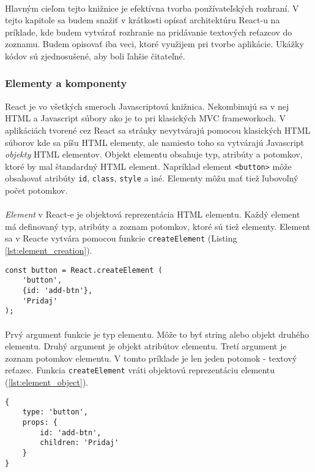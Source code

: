 \paragraph{}
Hlavným cieľom tejto knižnice je efektívna tvorba používateľských rozhraní. V tejto kapitole sa budem snažiť v krátkosti opísať architektúru React-u na príklade, kde budem vytvárať rozhranie na pridávanie textových reťazcov do zoznamu. Budem opisovať iba veci, ktoré využijem pri tvorbe aplikácie. Ukážky kódov sú zjednosušené, aby boli ľahšie čitateľné.

\subsubsection{Elementy a komponenty}
React je vo všetkých smeroch Javascriptová knižnica. Nekombinujú sa v nej HTML a Javascript súbory ako je to pri klasických MVC frameworkoch. V aplikáciách tvorené cez React sa stránky nevytvárajú pomocou klasických HTML súborov kde sa píšu HTML elementy, ale namiesto toho sa vytvárajú Javascript \emph{objekty} HTML elementov. Objekt elementu obsahuje typ, atribúty a potomkov, ktoré by mal štandardný HTML element. Napríklad element \texttt{<button>} môže obsahovať atribúty \texttt{id}, \texttt{class}, \texttt{style} a iné. Elementy môžu mať tiež ľubovoľný počet potomkov.
\paragraph{}
\emph{Element} v React-e je objektová reprezentácia HTML elementu. Každý element má definovaný typ, atribúty a zoznam potomkov, ktoré sú tiež elementy. Element sa v Reacte vytvára pomocou funkcie \texttt{createElement} (Listing \ref{lst:element_creation}).
\begin{lstlisting}[caption={Vytvorenie jednoduchého elementu}, label={lst:element_creation}]
const button = React.createElement (
    'button',
    {id: 'add-btn'},
    'Pridaj'
);
\end{lstlisting}
\paragraph{}
Prvý argument funkcie je typ elementu. Môže to byť string alebo objekt druhého elementu. Druhý argument je objekt atribútov elementu. Tretí argument je zoznam potomkov elementu. V tomto príklade je len jeden potomok - textový reťazec. Funkcia \texttt{createElement} vráti objektovú reprezentáciu elementu (\ref{lst:element_object}).
\begin{lstlisting}[caption={Objektová reprezentácia elementu}, label={lst:element_object}]
{
    type: 'button',
    props: {
        id: 'add-btn',
        children: 'Pridaj'
    }
}
\end{lstlisting}
